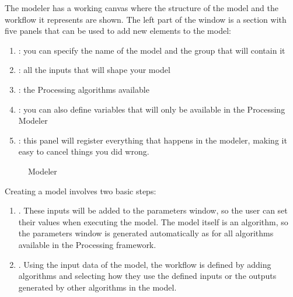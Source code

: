 \documentclass[letterpaper,10pt,english]{sphinxmanual}
\begin{document}
\sphinxAtStartPar
The modeler has a working canvas where the structure of the model and
the workflow it represents are shown.
The left part of the window is a section with five panels that can be used
to add new elements to the model:
\begin{enumerate}
%
\item {} 
\sphinxAtStartPar
{}: you can specify the name of the model and the group that
will contain it

\item {} 
\sphinxAtStartPar
{}: all the inputs that will shape your model

\item {} 
\sphinxAtStartPar
{}: the Processing algorithms available

\item {} 
\sphinxAtStartPar
{}: you can also define variables that will only be available in
the Processing Modeler

\item {} 
\sphinxAtStartPar
{}: this panel will register everything that happens in the
modeler, making it easy to cancel things you did wrong.

\end{enumerate}

\begin{figure}[H]
\centering
\capstart

\noindent{}
\caption{Modeler}\label{\detokenize{Introduction/models:id1}}\label{\detokenize{Introduction/models:figure-modeler}}\end{figure}

\sphinxAtStartPar
Creating a model involves two basic steps:
\begin{enumerate}
%
\item {} 
\sphinxAtStartPar
{}.
These inputs will be added to the parameters window, so the user
can set their values when executing the model.
The model itself is an algorithm, so the parameters window is
generated automatically as for all algorithms
available in the Processing framework.

\item {} 
\sphinxAtStartPar
{}.
Using the input data of the model, the workflow is defined by
adding algorithms and selecting how they use the defined inputs
or the outputs generated by other algorithms in the model.

\end{enumerate}
\end{document}
